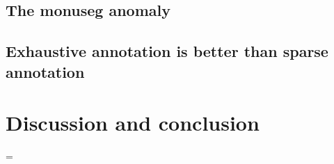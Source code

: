 \subsection{The \acrshort{monuseg} anomaly}

\subsection{Exhaustive annotation is better than sparse annotation }



\section{Discussion and conclusion}

\parencite{haridas2015interactive, petit2018handling, petit2021iterative}=